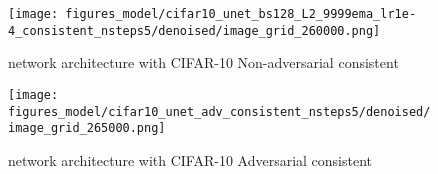 \documentclass{article} \usepackage{iclr2021_conference_notitle,times}
\theoremstyle{definition}
\theoremstyle{definition}
\begin{document}
\begin{figure}[ht] 
    \centering
    \texttt{[image: figures\_model/cifar10\_unet\_bs128\_L2\_9999ema\_lr1e-4\_consistent\_nsteps5/denoised/image\_grid\_260000.png]}
    \caption{\citet{ho2020denoising} network architecture with CIFAR-10 Non-adversarial consistent } 
\end{figure}
\begin{figure}[ht] 
    \centering
    \texttt{[image: figures\_model/cifar10\_unet\_adv\_consistent\_nsteps5/denoised/image\_grid\_265000.png]}
    \caption{\citet{ho2020denoising} network architecture with CIFAR-10 Adversarial consistent } 
\end{figure}
\end{document}
